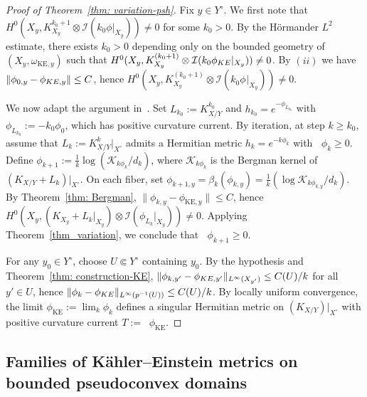 \documentclass[a4paper, 11pt]{amsart}
\theoremstyle{plain}
\numberwithin{equation}{section} %
\numberwithin{figure}{section} %
\theoremstyle{plain}
\theoremstyle{plain}
\theoremstyle{plain}
\theoremstyle{plain}
\theoremstyle{remark}
\theoremstyle{definition}
\theoremstyle{definition}
\newcommand{\K}{\mathcal{K}}
\DeclareMathOperator \ddc{\textrm{dd}^c}
\begin{document}
 \begin{proof}[Proof of Theorem~\ref{thm: variation-psh}]  
 Fix $y\in Y^\circ$. We first note that $H^0(X_y, K_{X_y}^{k_0+1}\otimes \mathcal{I}(k_0\phi|_{X_y}))\neq 0$ for some $k_0>0$. By the H\"ormander $L^2$ estimate, there exists $k_0>0$ depending only on the bounded geometry of $(X_y,\omega_{\mathrm{KE},y})$ such that
$H^0(X_{y}, K^{(k_0+1)}_{X_{y}} \otimes \mathcal{I}(k_0\phi_{ \rm KE}|_{X_{y}}))\neq 0$. By $(ii)$ we have $\| \phi_{0,y}-\phi_{{\rm KE}, y}\|\leq C$,  hence $H^0(X_{y}, K^{(k_0+1)}_{X_{y}} \otimes \mathcal{I}(k_0\phi_{}|_{X_{y}}))\neq 0$. 

We now adapt the argument  in~\cite{Tsuji10-construction-KE}. 
Set $L_{k_0}:=K_{X/Y}^{k_0}$ and $h_{k_0}=e^{-\phi_{L_{k_0}}}$ with $\phi_{L_{k_0}}:=-k_0\phi_0$, which has positive curvature current.  %
 By iteration, at step $k\geq k_0$, assume that  $L_k:=K_{X/Y}^k|_{X^\circ}$ admits a Hermitian metric $h_k=e^{-k\phi_k}$ with $ \ddc\phi_k\geq 0$. Define $\phi_{k+1}:=\frac{1}{k}\log(\K_{k\phi_k}/d_k)$, where $\K_{k\phi_k}$ is the Bergman kernel of $(K_{X/Y}+L_k)|_{X^\circ}$. On each fiber, set $\phi_{k+1,y}=\beta_k(\phi_{k,y})=\frac{1}{k}(\log \K_{k\phi_{k,y}}/d_k)$. By Theorem~\ref{thm: Bergman}, $\|\phi_{k,y}-\phi_{\mathrm{KE},y}\|\le C$, hence $H^0(X_y,(K_{X_y}+L_k|_{X_y})\otimes \mathcal{I}(\phi_{L_k}|_{X_y}))\neq 0$. Applying Theorem~\ref{thm_variation}, we conclude that $\ddc\phi_{k+1}\ge 0$.

 \smallskip
     For any $y_0\in Y^\circ$, choose $U\Subset Y^\circ$ containing $y_0$. By the hypothesis and Theorem~\ref{thm: construction-KE}, $\|\phi_{k, y'} -\phi_{{\rm KE},y'}\|_{L^\infty(X_{y'})}\leq C(U)/k$ for all $y'\in U$,  hence $\|\phi_{k} -\phi_{\rm KE}\|_{L^\infty(p^{-1}(U))}\leq C(U)/k$. By locally uniform convergence, the limit $\phi_{\mathrm{KE}}:=\lim_k \phi_k$ defines a singular Hermitian metric on $(K_{X/Y})|_{X^\circ}$ with positive curvature current $T:=\ddc\phi_{\mathrm{KE}}$. 
\end{proof}
\subsection{Families of K\"ahler--Einstein metrics on bounded pseudoconvex domains}
\end{document}
